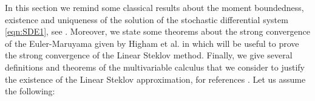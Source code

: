 In this section we remind some classical results  about the moment boundedness, existence 
and uniqueness of the solution of the stochastic differential system \eqref{eqn:SDE1}, 
see \cite{Higham2002b,Mao2013,Mao2007}. Moreover, we state some theorems about the strong 
convergence of the Euler-Maruyama given by Higham et al. in \cite{Higham2002b} which will be useful 
to prove the strong convergence of the Linear Steklov method. Finally, 
we give several definitions and theorems of the multivariable calculus 
that we consider to justify the existence of the Linear Steklov approximation, 
 for references \cite{Lawlor2012,FineAIandKass1966}. Let us assume
the following:


	


